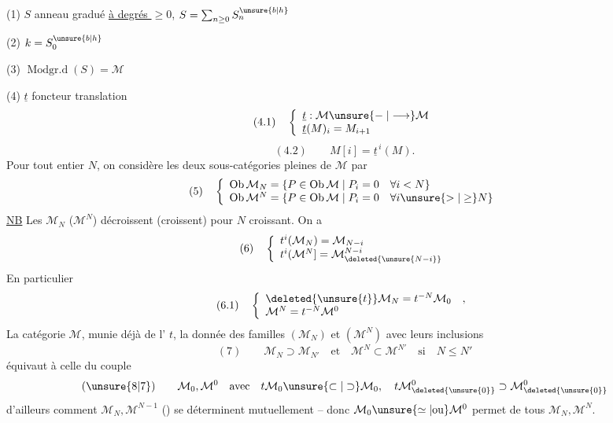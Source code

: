 (1) $S$ anneau gradué  \uline{à degrés $\geq0$}, $S=\sum_{n\geq0}S_n^{\unsure{b|h}}$


(2) $k=S_0^{\unsure{b|h}}$

(3) $\operatorname{Modgr.d}(S)=\mathcal M$

(4) $\underline t$ foncteur translation
\[
(4.1)\quad\left\{\begin{array}{l}
\underline t:\mathcal M\unsure{\mathrel{-}|\longrightarrow}\mathcal M\\
\underline t(M)_i=M_{i+1}
\end{array}\right.
\]
\[
(4.2)\qquad M[i]=\underline t^{\,i}(M).
\]
Pour tout entier $N$, on considère les deux sous-catégories  pleines  de $\mathcal M$  par
\[
(5)\quad\left\{\begin{array}{l}
\operatorname{Ob}\mathcal M_N=\{P\in\operatorname{Ob}\mathcal M\mid P_i=0\quad\forall i<N\}\\
\operatorname{Ob}\mathcal M^N=\{P\in\operatorname{Ob}\mathcal M\mid P_i=0\quad\forall i\unsure{>|\geq}N\}
\end{array}\right.
\]
\uline{NB} Les $\mathcal M_N$ ($\mathcal M^N$) décroissent (croissent) pour $N$ croissant. On a
\[
(6)\quad\left\{\begin{array}{l}
t^i(\mathcal M_N)=\mathcal M_{N-i}\\
t^i(\mathcal M^N]=\mathcal M^{N-i}_{\deleted{\unsure{N-i}}}
\end{array}\right.
\]
En particulier 
\[
(6.1)\quad\left\{\begin{array}{l}
\deleted{\unsure{t}}\mathcal M_N=t^{-N}\mathcal M_0\quad,\\
\mathcal M^N=t^{-N}\mathcal M^0
\end{array}\right.
\]
 La catégorie $\mathcal M$, munie déjà de l' $t$, la donnée des familles $(\mathcal M_N)$ et $(\mathcal M^N)$ avec leurs inclusions 
\[
(7)\qquad\mathcal M_N\supset\mathcal M_{N'}\quad\text{et}\quad\mathcal M^N\subset\mathcal M^{N'}\quad\text{si}\quad N\leq N'
\]
équivaut à celle  du couple
\[
(\unsure{8|7})\qquad\mathcal M_0,\mathcal M^0\quad\text{avec}\quad t\mathcal M_0\unsure{\subset|\supset}\mathcal M_0,\quad
 t\mathcal M^0_{\deleted{\unsure{0}}}\supset\mathcal M^0_{\deleted{\unsure{0}}}
\]
 d'ailleurs comment $\mathcal M_N,\mathcal M^{N-1}$ () se déterminent mutuellement -- donc $\mathcal M_0\unsure{\simeq|\text{ou}}\mathcal M^0$ permet de  tous  $\mathcal M_N,\mathcal M^N$.

